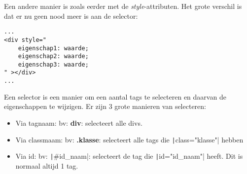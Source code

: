 Een andere manier is zoals eerder met de \emph{style}-attributen. Het grote verschil is dat er nu geen nood meer is aan de selector:
\begin{verbatim}
...
<div style="
    eigenschap1: waarde;
    eigenschap2: waarde;
    eigenschap3: waarde;
" ></div>
...
\end{verbatim}

Een selector is een manier om een aantal tags te selecteren en daarvan de
eigenschappen te wijzigen. Er zijn 3 grote manieren van selecteren:
\begin{itemize}
    \item Via tagnaam: bv: \textbf{div}: selecteert alle divs.
    \item Via classmaam: bv: \textbf{.klasse}: selecteert alle tags die
        \texttt|class="klasse"| hebben
    \item Via id: bv: \texttt|#id_naam|: selecteert de tag die
        \texttt|id="id_naam"| heeft. Dit is normaal altijd 1 tag.
\end{itemize}
